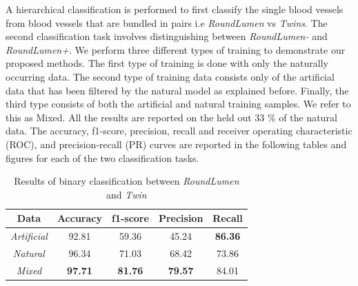 A hierarchical classification is performed to first classify the single blood vessels from blood vessels that are bundled in pairs i.e \textit{RoundLumen} vs \textit{Twins}. The second classification task involves distinguishing between \textit{RoundLumen-} and \textit{RoundLumen+}. We perform three different types of training to demonstrate our proposed methods. The first type of training is done with only the naturally occurring data. The second type of training data consists only of the artificial data that has been filtered by the natural model as explained before. Finally, the third type consists of both the artificial and natural training samples. We refer to this as Mixed. All the results are reported on the held out 33 \% of the natural data. The accuracy, f1-score, precision, recall and receiver operating characteristic (ROC), and precision-recall (PR) curves are reported in the following tables and figures for each of the two classification tasks. 

\begin{table}[ht!]
\centering
\caption{Results of binary classification between \textit{RoundLumen} and \textit{Twin}}
\begin{tabular}{ | c | c | c | c | c |} 
\hline
Data & Accuracy & f1-score & Precision & Recall \\ 
\hline
\textit{Artificial} & 92.81& 59.36	& 45.24 & \textbf{86.36} \\ 
\hline
\textit{Natural} & 96.34& 71.03& 68.42& 73.86 \\
\hline
\textit{Mixed} & \textbf{97.71} & \textbf{81.76} & \textbf{79.57} & 84.01 \\
\hline
\end{tabular}
\label{table:results}
\end{table}


